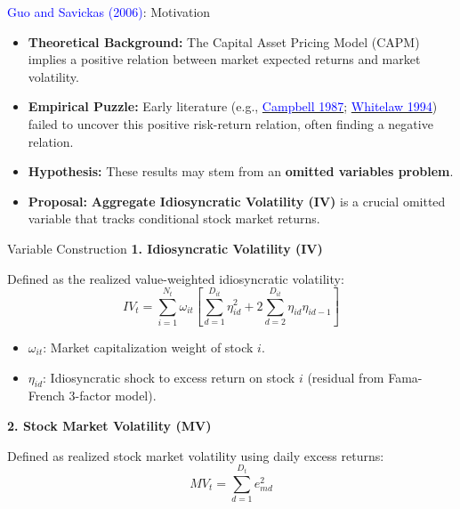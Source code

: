 \documentclass{beamer}
\begin{document}
\begin{frame}{\textcolor{blue}{Guo and Savickas (2006)}: Motivation}
    \begin{itemize}
         \item \textbf{Theoretical Background:} The Capital Asset Pricing Model (CAPM) implies a positive relation between market expected returns and market volatility.
         \item \textbf{Empirical Puzzle:} Early literature (e.g., \href{https://doi.org/10.1016/0304-405X(87)90045-6}{\textcolor{blue}{Campbell 1987}}; \href{https://doi.org/10.1111/j.1540-6261.1994.tb05150.x}{\textcolor{blue}{Whitelaw 1994}}) failed to uncover this positive risk-return relation, often finding a negative relation.
         \item \textbf{Hypothesis:} These results may stem from an \textbf{omitted variables problem}.
         \item \textbf{Proposal:} \textbf{Aggregate Idiosyncratic Volatility (IV)} is a crucial omitted variable that tracks conditional stock market returns.
    \end{itemize}
\end{frame}

\begin{frame}{Variable Construction}
    \textbf{1. Idiosyncratic Volatility (IV)}
    
     Defined as the realized value-weighted idiosyncratic volatility:
    \begin{equation}
        IV_{t} = \sum_{i=1}^{N_{t}} \omega_{it} \left[ \sum_{d=1}^{D_{it}} \eta_{id}^{2} + 2 \sum_{d=2}^{D_{it}} \eta_{id} \eta_{id-1} \right]
    \end{equation}
    \begin{itemize}
        \item $\omega_{it}$: Market capitalization weight of stock $i$.
         \item $\eta_{id}$: Idiosyncratic shock to excess return on stock $i$ (residual from Fama-French 3-factor model).
    \end{itemize}

    
    \textbf{2. Stock Market Volatility (MV)}
    
     Defined as realized stock market volatility using daily excess returns:
    \begin{equation}
        MV_{t} = \sum_{d=1}^{D_{t}} e_{md}^2
    \end{equation}
\end{frame}
\end{document}
